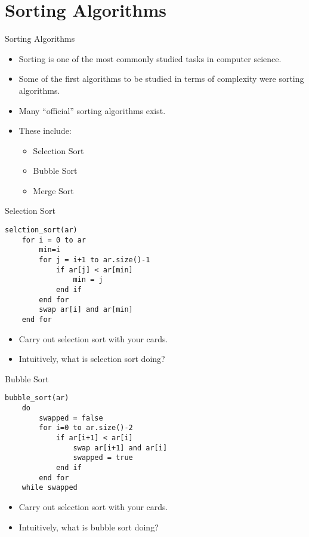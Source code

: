 \documentclass[]{beamer}
\begin{document}
\section{Sorting Algorithms}
\begin{frame}{Sorting Algorithms}
\begin{itemize}[<+->]
    \item Sorting is one of the most commonly studied tasks in
        computer science.
    \item Some of the first algorithms to be studied in terms of
        complexity were sorting algorithms.
    \item Many ``official'' sorting algorithms exist.
    \item These include:
    \begin{itemize}
        \item Selection Sort
        \item Bubble Sort
        \item Merge Sort
    \end{itemize}
\end{itemize}
\end{frame}

\begin{frame}[fragile]{Selection Sort}
\begin{verbatim}
selction_sort(ar)
    for i = 0 to ar
        min=i
        for j = i+1 to ar.size()-1
            if ar[j] < ar[min] 
                min = j
            end if
        end for
        swap ar[i] and ar[min]
    end for
\end{verbatim}
\begin{itemize}[<+->]
    \item Carry out selection sort with your cards.
    \item Intuitively, what is selection sort doing?
\end{itemize}
\end{frame}

\begin{frame}[fragile]{Bubble Sort}
\begin{verbatim}
bubble_sort(ar)
    do
        swapped = false
        for i=0 to ar.size()-2
            if ar[i+1] < ar[i]
                swap ar[i+1] and ar[i]
                swapped = true
            end if
        end for
    while swapped
\end{verbatim}
\begin{itemize}[<+->]
    \item Carry out selection sort with your cards.
    \item Intuitively, what is bubble sort doing?
\end{itemize}
\end{frame}
\end{document}
